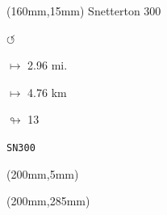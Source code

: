 \begin{textblock*}{40mm}(160mm,15mm)%
Snetterton 300
\par \Huge$\circlearrowleft$
\Large
\par$\mapsto$ 2.96 mi.
\par$\mapsto$ 4.76 km
\par$\looparrowright$ 13
\par\hfill\tiny\tt SN300\\
\end{textblock*}
\begin{textblock*}{20mm}(200mm,5mm)%
\fbox{\thepage}
\end{textblock*}
\begin{textblock*}{20mm}(200mm,285mm)%
\fbox{\thepage}
\end{textblock*}
\null\newpage

